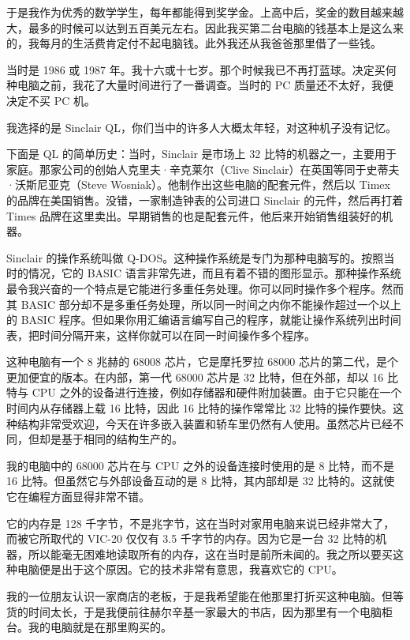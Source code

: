 于是我作为优秀的数学学生，每年都能得到奖学金。上高中后，奖金的数目越来越大，最多的时候可以达到五百美元左右。因此我买第二台电脑的钱基本上是这么来的，我每月的生活费肯定付不起电脑钱。此外我还从我爸爸那里借了一些钱。

当时是 1986 或 1987 年。我十六或十七岁。那个时候我已不再打蓝球。决定买何种电脑之前，我花了大量时间进行了一番调查。当时的 PC 质量还不太好，我便决定不买 PC 机。

我选择的是 Sinclair QL，你们当中的许多人大概太年轻，对这种机子没有记忆。

下面是 QL 的简单历史：当时，Sinclair 是市场上 32 比特的机器之一，主要用于家庭。那家公司的创始人克里夫·辛克莱尔（Clive Sinclair）在英国等同于史蒂夫·沃斯尼亚克（Steve Wosniak）。他制作出这些电脑的配套元件，然后以 Timex 的品牌在美国销售。没错，一家制造钟表的公司进口 Sinclair 的元件，然后再打着 Times 品牌在这里卖出。早期销售的也是配套元件，他后来开始销售组装好的机器。

 Sinclair 的操作系统叫做 Q-DOS。这种操作系统是专门为那种电脑写的。按照当时的情况，它的 BASIC 语言非常先进，而且有着不错的图形显示。那种操作系统最令我兴奋的一个特点是它能进行多重任务处理。你可以同时操作多个程序。然而其 BASIC 部分却不是多重任务处理，所以同一时间之内你不能操作超过一个以上的 BASIC 程序。但如果你用汇编语言编写自己的程序，就能让操作系统列出时间表，把时间分隔开来，这样你就可以在同一时间操作多个程序。

这种电脑有一个 8 兆赫的 68008 芯片，它是摩托罗拉 68000 芯片的第二代，是个更加便宜的版本。在内部，第一代 68000 芯片是 32 比特，但在外部，却以 16 比特与 CPU 之外的设备进行连接，例如存储器和硬件附加装置。由于它只能在一个时间内从存储器上载 16 比特，因此 16 比特的操作常常比 32 比特的操作要快。这种结构非常受欢迎，今天在许多嵌入装置和轿车里仍然有人使用。虽然芯片已经不同，但却是基于相同的结构生产的。

我的电脑中的 68000 芯片在与 CPU 之外的设备连接时使用的是 8 比特，而不是 16 比特。但虽然它与外部设备互动的是 8 比特，其内部却是 32 比特的。这就使它在编程方面显得非常不错。

它的内存是 128 千字节，不是兆字节，这在当时对家用电脑来说已经非常大了，而被它所取代的 VIC-20 仅仅有 3.5 千字节的内存。因为它是一台 32 比特的机器，所以能毫无困难地读取所有的内存，这在当时是前所未闻的。我之所以要买这种电脑便是出于这个原因。它的技术非常有意思，我喜欢它的 CPU。

我的一位朋友认识一家商店的老板，于是我希望能在他那里打折买这种电脑。但等货的时间太长，于是我便前往赫尔辛基一家最大的书店，因为那里有一个电脑柜台。我的电脑就是在那里购买的。

